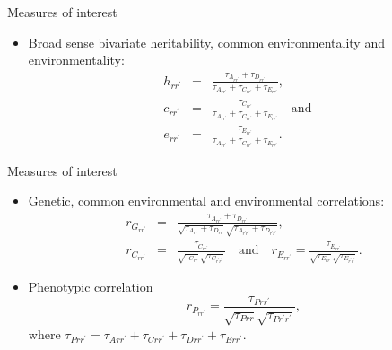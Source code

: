\documentclass[
  ignorenonframetext,
  serif,
  professionalfont,
  usenames,
  dvipsnames,
  aspectratio = 169]{beamer}
\providecommand{\tightlist}{%
  \setlength{\itemsep}{0pt}\setlength{\parskip}{0pt}}
\renewcommand{\tightlist}{%
  \setlength{\itemsep}{0\baselineskip}
  \setlength{\parskip}{0.25\baselineskip}
}
\begin{document}
\begin{frame}{Measures of interest}
\protect\hypertarget{measures-of-interest}{}
\begin{itemize}
\tightlist
\item
  Broad sense bivariate heritability, common environmentality and
  environmentality: \begin{eqnarray*}
  h_{rr^{\prime}} &=& \frac{\tau_{A_{rr^{\prime}}} + \tau_{D_{rr^{\prime}}} } {\tau_{A_{rr^{\prime}}} + \tau_{C_{rr^{\prime}}} + \tau_{E_{rr^{\prime}}} }, \\
  c_{rr^{\prime}} &=& \frac{\tau_{C_{rr^{\prime}}} } {\tau_{A_{rr^{\prime}}} + \tau_{C_{rr^{\prime}}} + \tau_{E_{rr^{\prime}}} } \quad \text{and} \quad \\
  e_{rr^{\prime}} &=& \frac{\tau_{E_{rr^{\prime}}} } {\tau_{A_{rr^{\prime}}} + \tau_{C_{rr^{\prime}}} + \tau_{E_{rr^{\prime}}} }.
  \end{eqnarray*}
\end{itemize}
\end{frame}

\begin{frame}{Measures of interest}
\protect\hypertarget{measures-of-interest-1}{}
\begin{itemize}
\item
  Genetic, common environmental and environmental correlations:
  \begin{eqnarray*}
  r_{G_{rr^{\prime}}} &=& \frac{ \tau_{A_{rr^{\prime}}} + \tau_{D_{rr^{\prime}}} }{ \sqrt{\tau_{A_{rr}} + \tau_{D_{rr}}} \sqrt{\tau_{A_{r^{\prime}r^{\prime}}} + \tau_{D_{r^{\prime}r^{\prime}}} } },  \\
  r_{C_{rr^{\prime}}} &=& \frac{ \tau_{C_{rr^{\prime}}} }{ \sqrt{\tau_{C_{rr}}} \sqrt{\tau_{C_{r^{\prime}r^{\prime}}} } } \quad \text{and} \quad
  r_{E_{rr^{\prime}}} = \frac{ \tau_{E_{rr^{\prime}}} }{ \sqrt{\tau_{E_{rr}}} \sqrt{\tau_{E_{r^{\prime}r^{\prime}}} } }.
  \end{eqnarray*}
\item
  Phenotypic correlation \begin{equation*}
  r_{P_{rr^{\prime}}} = \frac{\tau_{Prr^{\prime}}}{\sqrt{ \tau_{Prr}}\sqrt{ \tau_{Pr^{\prime}r^{\prime}}} },
  \end{equation*} where
  \(\tau_{Prr^{\prime}} = \tau_{Arr^{\prime}} + \tau_{C{rr^{\prime}}} + \tau_{D{rr^{\prime}}} + \tau_{E{rr^{\prime}}}.\)
\end{itemize}
\end{frame}
\end{document}
